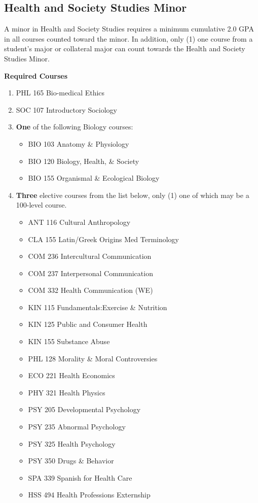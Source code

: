 \documentclass[
  letterpaper,
]{scrbook}
\providecommand{\tightlist}{%
  \setlength{\itemsep}{0pt}\setlength{\parskip}{0pt}}
\begin{document}
\subsection{Health and Society Studies
Minor}\label{health-and-society-studies-minor}

A minor in Health and Society Studies requires a minimum cumulative 2.0
GPA in all courses counted toward the minor. In addition, only (1) one
course from a student's major or collateral major can count towards the
Health and Society Studies Minor.

\textbf{Required Courses}

\begin{enumerate}
\def\labelenumi{\arabic{enumi}.}
\tightlist
\item
  PHL 165 Bio-medical Ethics
\item
  SOC 107 Introductory Sociology
\item
  \textbf{One} of the following Biology courses:

  \begin{itemize}
  \tightlist
  \item
    BIO 103 Anatomy \& Physiology
  \item
    BIO 120 Biology, Health, \& Society
  \item
    BIO 155 Organismal \& Ecological Biology
  \end{itemize}
\item
  \textbf{Three} elective courses from the list below, only (1) one of
  which may be a 100-level course.

  \begin{itemize}
  \tightlist
  \item
    ANT 116 Cultural Anthropology
  \item
    CLA 155 Latin/Greek Origins Med Terminology
  \item
    COM 236 Intercultural Communication
  \item
    COM 237 Interpersonal Communication
  \item
    COM 332 Health Communication (WE)
  \item
    KIN 115 Fundamentals:Exercise \& Nutrition
  \item
    KIN 125 Public and Consumer Health
  \item
    KIN 155 Substance Abuse
  \item
    PHL 128 Morality \& Moral Controversies
  \item
    ECO 221 Health Economics
  \item
    PHY 321 Health Physics
  \item
    PSY 205 Developmental Psychology
  \item
    PSY 235 Abnormal Psychology
  \item
    PSY 325 Health Psychology
  \item
    PSY 350 Drugs \& Behavior
  \item
    SPA 339 Spanish for Health Care
  \item
    HSS 494 Health Professions Externship
  \end{itemize}
\end{enumerate}
\end{document}
